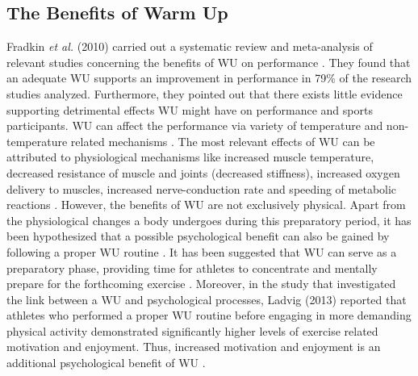\subsection{The Benefits of Warm Up}
Fradkin \textit{et al.} (2010) carried out a systematic review and meta-analysis of relevant studies concerning the benefits of WU on performance \cite{fradkin2006does}. They found that an adequate WU supports an improvement in performance in 79\% of the research studies analyzed. Furthermore, they pointed out that there exists little evidence supporting detrimental effects WU might have on performance and sports participants.
WU can affect the performance via variety of temperature and non-temperature related mechanisms \cite{bishop2003warm1}. 
The most relevant effects of WU can be attributed to physiological mechanisms like increased muscle temperature, decreased resistance of muscle and joints (decreased stiffness), increased oxygen delivery to muscles, increased nerve-conduction rate and speeding of metabolic reactions \cite{bishop2003warm1}. 
However, the benefits of WU are not exclusively physical. Apart from the physiological changes a body undergoes during this preparatory period, it has been hypothesized that a possible psychological benefit can also be gained by following a proper WU routine \cite{bishop2003warm1,shellock1985warming}.
It has been suggested that WU can serve as a preparatory phase, providing time for athletes to concentrate and mentally prepare for the forthcoming exercise \cite{shellock1985warming}. 
Moreover, in the study that investigated the link between a WU and psychological processes, Ladvig (2013) reported that athletes who performed a proper WU routine before engaging in more demanding physical activity demonstrated significantly higher levels of exercise related motivation and enjoyment. Thus, increased motivation and enjoyment is an additional psychological benefit of WU \cite{ladwig2013psychological}.
